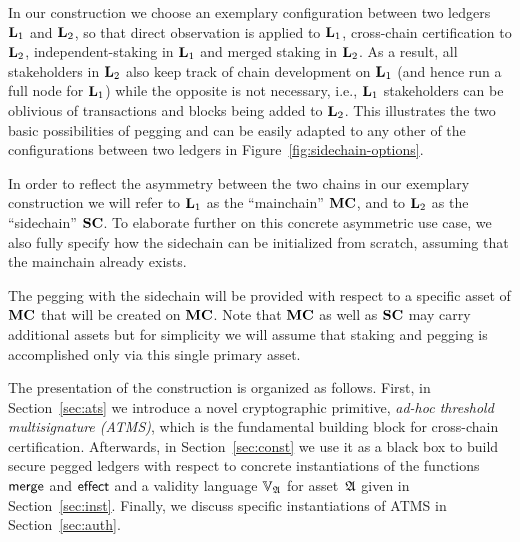 In our construction we choose an exemplary
configuration between two ledgers $\Ledger_1$ and
$\Ledger_2$, so that direct observation is applied to $\Ledger_1$,
cross-chain certification to $\Ledger_2$, independent-staking in $\Ledger_1$ and
merged staking in $\Ledger_2$.
As a result, all stakeholders in $\Ledger_2$ also keep track
of chain development on $\Ledger_1$ (and hence run a full node for $\Ledger_1$)
while the opposite is not necessary, i.e.,
$\Ledger_1$ stakeholders can be oblivious of transactions and
blocks being added to $\Ledger_2$.
This illustrates the two basic possibilities
of pegging and can be easily adapted
to  any other of the configurations between two ledgers in Figure~\ref{fig:sidechain-options}.

In order to reflect the asymmetry between the two chains in our exemplary
construction we will refer to $\Ledger_1$ as the ``mainchain'' $\MC$, and to
$\Ledger_2$ as the ``sidechain'' $\SC$. To elaborate further on this concrete
asymmetric use case, we also fully specify how the sidechain can be
initialized from scratch, assuming that the mainchain already exists.



The pegging with the sidechain will be provided with respect to a specific asset of $\MC$
that will be created on $\MC$.
Note that $\MC$ as well as $\SC$ may carry
additional assets but for simplicity we will assume that staking and pegging is
accomplished only via this single primary asset.

The presentation of the construction is organized as follows. First, in Section~\ref{sec:ats} we introduce a novel
cryptographic primitive, \emph{ad-hoc threshold multisignature (ATMS)}, which is the fundamental building block for cross-chain certification.
Afterwards, in Section~\ref{sec:const} we use it as a black box to build secure
pegged ledgers with respect to concrete instantiations of the functions $\merge$
and $\effect$ and a validity language $\adalang$ for asset~$\ada$ given in Section~\ref{sec:inst}.
Finally, we discuss specific instantiations of ATMS in
Section~\ref{sec:auth}.
